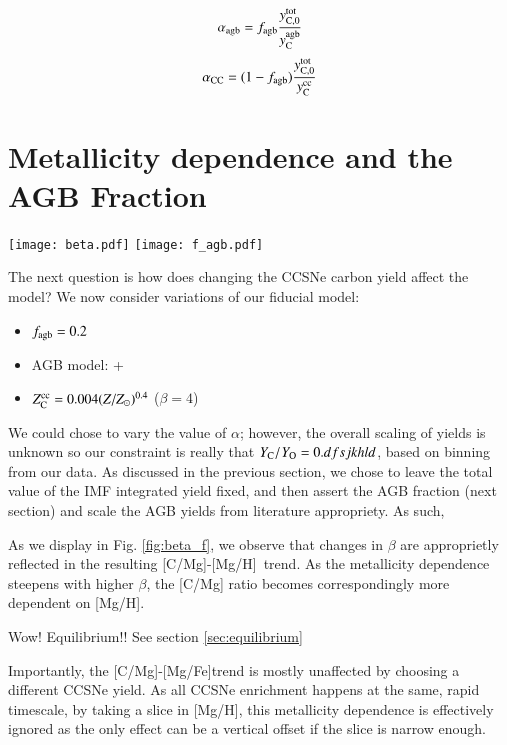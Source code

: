 \documentclass[12pt,oneside]{book}
\newcommand{\cristallo}{\citetalias{cristallo+11}+\citetalias{cristallo+15}}
\newcommand{\caah}{[C/Mg]-[Mg/H]}
\newcommand{\caafe}{[C/Mg]-[Mg/Fe]}
\newcommand{\Ycc}{\ensuremath{y_{\rm C}^{\rm cc}}}
\newcommand{\Yct}{\ensuremath{y_{\rm C, 0}^{\rm tot}}}
\newcommand{\Ycagb}{\ensuremath{y_{\rm C}^{\rm agb}}}
\newcommand{\sun}{\ensuremath{\odot}}
\begin{document}
\begin{equation}
    \alpha_{\rm agb} = f_{\rm agb} \frac{\Yct}{\Ycagb}
\end{equation}
\begin{equation}
    \alpha_{\rm CC} = (1 - f_{\rm agb}) \frac{\Yct}{\Ycc}
\end{equation}

\section{Metallicity dependence and the AGB Fraction}

\begin{figure*}\label{fig:beta_f}
\texttt{[image: beta.pdf]}
\texttt{[image: f\_agb.pdf]}

\caption{Similar to \ref{fig:agb_sims} except the top plot shows the fiducial model with lower and higher values of $\beta$, the C-CCSNe metallicity dependence. The bottom plot is the same except shows varying AGB fractions.}
\end{figure*}

The next question is how does changing the CCSNe carbon yield affect the model?
We now consider variations of our fiducial model:
\begin{itemize}
    \item $f_{\rm agb} = 0.2$
    \item AGB model: \cristallo
    \item $Z_{\rm C}^{\rm cc} = 0.004 (Z/Z_{\sun })^{0.4}$ ($\beta = 4$)
\end{itemize}

We could chose to vary the value of $\alpha$; however, the overall scaling of
yields is unknown so our constraint is really that $Y_{\rm C}/Y_{\rm O} =
0.dfsjkhld$, based on binning from our data. As discussed in the previous
section, we chose to leave the total value of the IMF integrated yield fixed,
and then assert the AGB fraction (next section) and scale the AGB yields from
literature appropriety. As such, 

As we display in Fig. \ref{fig:beta_f}, we observe that changes in $\beta$ are
approprietly reflected in the resulting \caah~trend. As the metallicity
dependence steepens with higher $\beta$, the [C/Mg] ratio becomes
correspondingly more dependent on [Mg/H].

Wow! Equilibrium!! See section \ref{sec:equilibrium}

Importantly, the \caafe trend is mostly unaffected by choosing a different
CCSNe yield. As all CCSNe enrichment happens at the same, rapid timescale, by
taking a slice in [Mg/H], this metallicity dependence is effectively ignored as
the only effect can be a vertical offset if the slice is narrow enough. 
\end{document}
